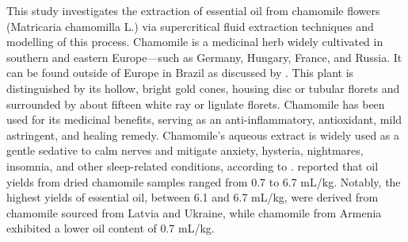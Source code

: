 \documentclass[../Article_Model_Parameters.tex]{subfiles}
\begin{document}
	
	This study investigates the extraction of essential oil from chamomile flowers (Matricaria chamomilla L.) via supercritical fluid extraction techniques and modelling of this process. Chamomile is a medicinal herb widely cultivated in southern and eastern Europe—such as Germany, Hungary, France, and Russia. It can be found outside of Europe in Brazil as discussed by \citet{Singh2011}. This plant is distinguished by its hollow, bright gold cones, housing disc or tubular florets and surrounded by about fifteen white ray or ligulate florets. Chamomile has been used for its medicinal benefits, serving as an anti-inflammatory, antioxidant, mild astringent, and healing remedy. Chamomile's aqueous extract is widely used as a gentle sedative to calm nerves and mitigate anxiety, hysteria, nightmares, insomnia, and other sleep-related conditions, according to \citet{Srivastava2009}. \citet{Orav2010} reported that oil yields from dried chamomile samples ranged from 0.7 to 6.7 mL/kg. Notably, the highest yields of essential oil, between 6.1 and 6.7 mL/kg, were derived from chamomile sourced from Latvia and Ukraine, while chamomile from Armenia exhibited a lower oil content of 0.7 mL/kg.
	
	
	
\end{document}
